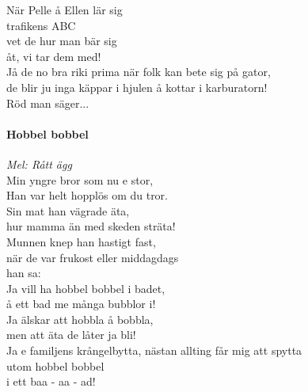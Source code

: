 \hspace{0.1\textwidth}
\noindent
\begin{minipage}{0.45\textwidth}
	
	\noindent
	När Pelle å Ellen lär sig\\
	trafikens ABC\\
	vet de hur man bär sig\\
	åt, vi tar dem med!\\


	\noindent
	Jå de no bra riki prima när folk kan bete sig på gator,\\
	de blir ju inga käppar i hjulen å kottar i karburatorn!\\


	Röd man säger...\\


	
	\paragraph*{Hobbel bobbel\\}
	\vspace{3px}
	\textit{Mel: Rått ägg}\\
	
	\noindent
	Min yngre bror som nu e stor,\\
	Han var helt hopplös om du tror.\\
	Sin mat han vägrade äta,\\
	hur mamma än med skeden sträta!\\
	Munnen knep han hastigt fast,\\
	när de var frukost eller middagdags\\
	han sa:\\
	
	\noindent
	Ja vill ha hobbel bobbel i badet,\\
	å ett bad me många bubblor i!\\
	Ja älskar att hobbla å bobbla,\\
	men att äta de låter ja bli!\\
	Ja e familjens krångelbytta,
	nästan allting får mig att spytta\\
	utom hobbel bobbel\\
	i ett baa - aa - ad!\\
	\vspace{5.35cm}
	
\end{minipage}